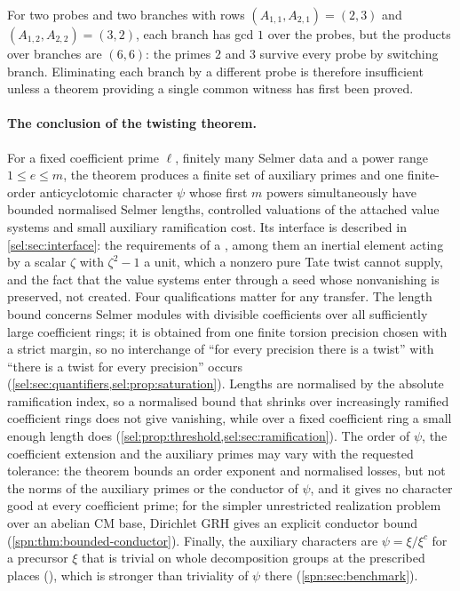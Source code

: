 \begin{example}\label{src:ex:gcd}
For two probes and two branches with rows $(A_{1,1},A_{2,1})=(2,3)$ and
$(A_{1,2},A_{2,2})=(3,2)$, each branch has gcd $1$ over the probes, but the products over
branches are $(6,6)$: the primes $2$ and $3$ survive every probe by switching branch. Eliminating
each branch by a different probe is therefore insufficient unless a theorem providing a single
common witness has first been proved.
\end{example}

\paragraph{The conclusion of the twisting theorem.}
For a fixed coefficient prime $\ell$, finitely many Selmer data and a power range
$1\le e\le m$, the theorem  produces a finite set of
auxiliary primes and one finite-order anticyclotomic character $\psi$ whose first $m$ powers
simultaneously have bounded normalised Selmer lengths, controlled valuations of the attached
value systems and small auxiliary ramification cost. Its interface is described in
\cref{sel:sec:interface}: the requirements of a , among them an inertial
element acting by a scalar $\zeta$ with $\zeta^2-1$ a unit, which a nonzero pure Tate twist
cannot supply, and the fact that the value systems enter through a seed whose nonvanishing is
preserved, not created. Four qualifications matter for any transfer. The length bound concerns
Selmer modules with divisible coefficients over all sufficiently large coefficient rings; it is
obtained from one finite torsion precision chosen with a strict margin, so no interchange of
``for every precision there is a twist'' with ``there is a twist for every precision'' occurs
(\cref{sel:sec:quantifiers,sel:prop:saturation}). Lengths are normalised by the absolute
ramification index, so a normalised bound that shrinks over increasingly ramified coefficient
rings does not give vanishing, while over a fixed coefficient ring a small enough length does
(\cref{sel:prop:threshold,sel:sec:ramification}). The order of $\psi$, the coefficient extension
and the auxiliary primes may vary with the requested tolerance: the theorem bounds an order
exponent and normalised losses, but not the norms of the auxiliary primes or the conductor of
$\psi$, and it gives no character good at every coefficient prime; for the simpler unrestricted
realization problem over an abelian CM base, Dirichlet GRH gives an explicit conductor bound
(\cref{spn:thm:bounded-conductor}). Finally, the auxiliary characters are $\psi=\xi/\xi^c$ for a
precursor $\xi$ that is trivial on whole decomposition groups at the prescribed places
(), which is stronger than triviality of $\psi$ there (\cref{spn:sec:benchmark}).

